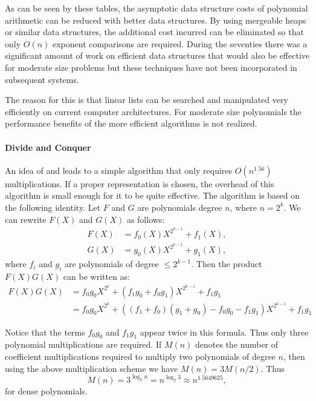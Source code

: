 As can be seen by these tables, the asymptotic data structure costs of
polynomial arithmetic can be reduced with better data structures.  By
using mergeable heaps or similar data structures, the additional cost
incurred can be eliminated so that only $O(n)$ exponent comparisons
are required.  During the seventies there was a significant amount of
work on efficient data structures that would also be effective for
moderate size problems \cite{Horowitz1975-xl,Klip1979-pd} but these techniques have not been incorporated in subsequent systems.

The reason for this is that linear lists can be searched and
manipulated very efficiently on current computer architectures.  For
moderate size polynomials the performance benefits of the more
efficient algorithms is not realized.

\paragraph{Divide and Conquer}

An idea of {\Karatsuba} and {\Ofman} \cite{Karatsuba1963-xj} leads to a
simple algorithm that only requires $O(n^{1.56})$ multiplications.  If
a proper representation is chosen, the overhead of this algorithm is
small enough for it to be quite effective.  The algorithm is based on
the following identity.  Let $F$ and $G$ are polynomials degree $n$,
where $n = 2^k$.  We can rewrite $F(X)$ and $G(X)$ as follows:
\[
\begin{aligned}
F(X)&= f_0(X) X^{2^{k-1}} + f_1(X),\\
G(X)&= g_0(X) X^{2^{k-1}} + g_1(X),
\end{aligned}
\]
where $f_i$ and $g_i$ are polynomials of degree $\le 2^{k-1}$.  Then
the product $F(X) G(X)$ can be written as:
\[
\begin{aligned}
  F(X) G(X) &= f_0 g_0 X^{2^k} + (f_1 g_0 + f_0 g_1) X^{2^{k-1}} + f_1 g_1\\
    &= f_0 g_0 X^{2^k} 
       + ((f_1 + f_0) (g_1 + g_0) - f_0 g_0 - f_1 g_1) X^{2^{k-1}}
       + f_1 g_1
\end{aligned}
\]

Notice that the terms $f_0 g_0$ and $f_1 g_1$ appear twice in this formula.
Thus only three polynomial multiplications are required.  If $M(n)$ denotes
the number of coefficient multiplications required to multiply two
polynomials of degree $n$, then using the above multiplication scheme we
have $M(n) = 3 M(n/2)$.  Thus
\[
M(n) = 3 ^{\log_2 n} = n^{\log_2 3} \approx n^{1.5649625},
\]
for dense polynomials.  

